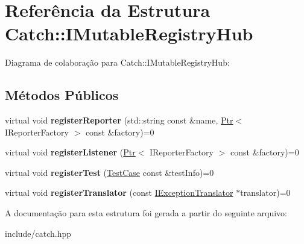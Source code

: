 \hypertarget{structCatch_1_1IMutableRegistryHub}{}\section{Referência da Estrutura Catch\+:\+:I\+Mutable\+Registry\+Hub}
\label{structCatch_1_1IMutableRegistryHub}


Diagrama de colaboração para Catch\+:\+:I\+Mutable\+Registry\+Hub\+:
\subsection*{Métodos Públicos}
\begin{DoxyCompactItemize}
\item 
virtual void {\bfseries register\+Reporter} (std\+::string const \&name, \hyperlink{classCatch_1_1Ptr}{Ptr}$<$ I\+Reporter\+Factory $>$ const \&factory)=0\hypertarget{structCatch_1_1IMutableRegistryHub_aab72d0aa1fa14627f1a6a4c893ae0a12}{}\label{structCatch_1_1IMutableRegistryHub_aab72d0aa1fa14627f1a6a4c893ae0a12}

\item 
virtual void {\bfseries register\+Listener} (\hyperlink{classCatch_1_1Ptr}{Ptr}$<$ I\+Reporter\+Factory $>$ const \&factory)=0\hypertarget{structCatch_1_1IMutableRegistryHub_ae06fcb90ba3f2b389d450cd81e229276}{}\label{structCatch_1_1IMutableRegistryHub_ae06fcb90ba3f2b389d450cd81e229276}

\item 
virtual void {\bfseries register\+Test} (\hyperlink{classCatch_1_1TestCase}{Test\+Case} const \&test\+Info)=0\hypertarget{structCatch_1_1IMutableRegistryHub_a11b85c6744d88c9f83fe16ad4a8dd451}{}\label{structCatch_1_1IMutableRegistryHub_a11b85c6744d88c9f83fe16ad4a8dd451}

\item 
virtual void {\bfseries register\+Translator} (const \hyperlink{structCatch_1_1IExceptionTranslator}{I\+Exception\+Translator} $\ast$translator)=0\hypertarget{structCatch_1_1IMutableRegistryHub_ae6825365102693cf7707db022a2c2b49}{}\label{structCatch_1_1IMutableRegistryHub_ae6825365102693cf7707db022a2c2b49}

\end{DoxyCompactItemize}


A documentação para esta estrutura foi gerada a partir do seguinte arquivo\+:\begin{DoxyCompactItemize}
\item 
include/catch.\+hpp\end{DoxyCompactItemize}
